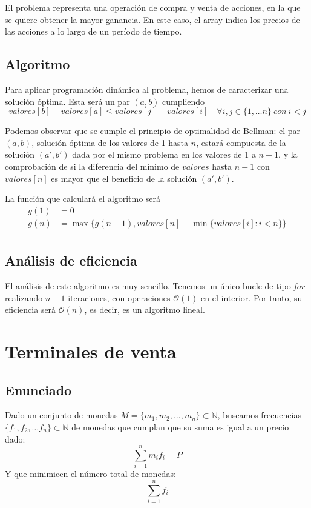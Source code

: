 \documentclass[a4paper, 11pt]{article} %
\begin{document}
      El problema representa una operación de compra y venta de acciones, en la que se quiere obtener la mayor ganancia. En este caso, el array indica los precios de las acciones a lo largo de un período de tiempo.
      
	\subsection{Algoritmo}
		Para aplicar programación dinámica al problema, hemos de caracterizar una solución óptima. Esta será un par $(a,b)$ cumpliendo
		$$ valores[b]-valores[a] \le valores[j]-valores[i]
		\quad \forall i,j \in \{1,\dots n\}\ con\ i<j $$
		
		Podemos observar que se cumple el principio de optimalidad de Bellman: el par $(a,b)$, solución óptima de los valores de 1 hasta $n$, estará compuesta de la solución $(a',b')$ dada por el mismo problema en los valores de 1 a $n-1$, y la comprobación de si la diferencia del mínimo de $valores$ hasta $n-1$ con $valores[n]$ es mayor que el beneficio de la solución $(a', b')$.
		
		La función que calculará el algoritmo será
  \begin{equation}
  \begin{split}
    	g(1)  &=  0 \\
    	g(n)  &=  \max \{ g(n-1), valores[n]-\min\{valores[i] : i < n\} \} \\
    	\end{split}
  \end{equation}
		
	\subsection{Análisis de eficiencia}
		El análisis de este algoritmo es muy sencillo. Tenemos un único bucle de tipo \textit{for} realizando $n-1$ iteraciones, con operaciones $\mathcal{O}(1)$ en el interior. Por tanto, su eficiencia será $\mathcal{O}(n)$, es decir, es un algoritmo lineal.

\section{Terminales de venta}
  \subsection{Enunciado}
    Dado un conjunto de monedas $M = \{m_1, m_2, \dots, m_n\} \subset \mathbb{N}$, buscamos frecuencias $\{f_1,f_2,\dots f_n\} \subset \mathbb{N}$ de 
    monedas que cumplan que su suma es igual a un precio dado:
    \begin{equation}
     \sum_{i=1}^n m_i f_i = P
    \end{equation}
    Y que minimicen el número total de monedas:
    \begin{equation}
     \sum_{i=1}^n f_i
    \end{equation}
    
\end{document}
